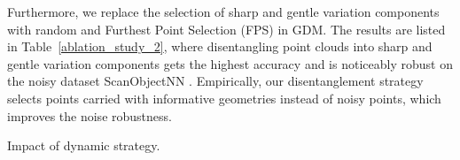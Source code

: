 \documentclass[letterpaper]{article} \usepackage{aaai21}  \usepackage{times}  \usepackage{helvet} \usepackage{courier}  \usepackage[hyphens]{url}  \usepackage{graphicx} \urlstyle{rm} \def\UrlFont{\rm}  \usepackage{natbib}  \usepackage{caption} \frenchspacing  \setlength{\pdfpagewidth}{8.5in}  \setlength{\pdfpageheight}{11in}  \usepackage{color}
\begin{document}
Furthermore, we replace the selection of sharp and gentle variation components with random and Furthest Point Selection (FPS) in GDM. The results are listed in Table~\ref{ablation_study_2}, where disentangling point clouds into sharp and gentle variation components gets the highest accuracy and is noticeably robust on the noisy dataset ScanObjectNN \cite{Uy_2019_ICCVnew}. Empirically, our disentanglement strategy selects points carried with informative geometries instead of noisy points, which improves the noise robustness. 
\begin{table}[t]
\begin{center}	
	\caption{Impact of dynamic strategy.}
	\label{ablation_study_3}
	\end{center}

\begin{center}
		\caption{Selecting different number of points in GDM on ModelNet40.}
	\label{M_FF}
\end{center}


\end{table}
\end{document}
